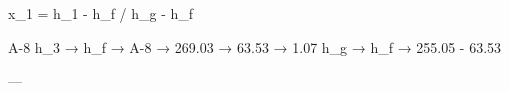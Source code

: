 x_1 = h_1 - h_f / h_g - h_f  

A-8  
h_3 → h_f → A-8 → 269.03 → 63.53 → 1.07  
h_g → h_f → 255.05 - 63.53  

---